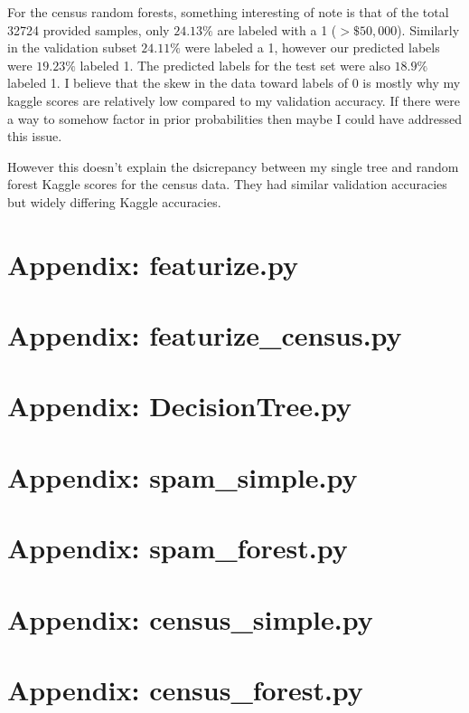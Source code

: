 \documentclass{article}
\begin{document}
For the census random forests, something interesting of note is that of the total 32724 provided samples, only $24.13\%$ are labeled with a 1 ($>\$50,000$). Similarly in the validation subset $24.11\%$ were labeled a 1, however our predicted labels were $19.23\%$ labeled 1. The predicted labels for the test set were also $18.9\%$ labeled 1. I believe that the skew in the data toward labels of 0 is mostly why my kaggle scores are relatively low compared to my validation accuracy. If there were a way to somehow factor in prior probabilities then maybe I could have addressed this issue.

However this doesn't explain the dsicrepancy between my single tree and random forest Kaggle scores for the census data. They had similar validation accuracies but widely differing Kaggle accuracies.

\pagebreak

\section*{Appendix: featurize.py}


\section*{Appendix: featurize\_census.py}


\section*{Appendix: DecisionTree.py}


\section*{Appendix: spam\_simple.py}


\section*{Appendix: spam\_forest.py}


\section*{Appendix: census\_simple.py}


\section*{Appendix: census\_forest.py}

\end{document}
